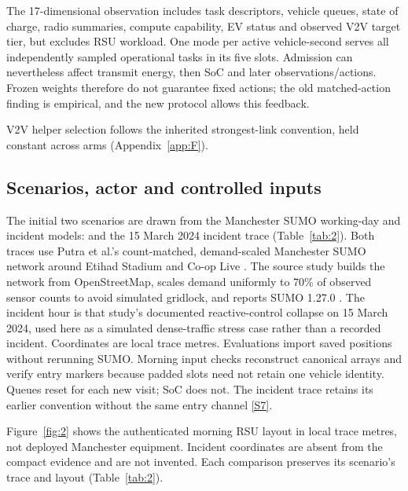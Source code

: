\documentclass[12pt,a4paper]{article}
\begin{document}
The 17-dimensional observation includes task descriptors, vehicle queues, state of charge, radio summaries, compute capability, EV status and observed V2V target tier, but excludes RSU workload. One mode per active vehicle-second serves all independently sampled operational tasks in its five slots. Admission can nevertheless affect transmit energy, then SoC and later observations/actions. Frozen weights therefore do not guarantee fixed actions; the old matched-action finding is empirical, and the new protocol allows this feedback.

V2V helper selection follows the inherited strongest-link convention, held constant across arms (Appendix~\ref{app:F}).

\FloatBarrier
\subsection{Scenarios, actor and controlled inputs}\label{sec:2.3}

The initial two scenarios are drawn from the Manchester SUMO working-day and incident models:  and the 15 March 2024 incident trace (Table~\ref{tab:2}). Both traces use Putra et al.'s count-matched, demand-scaled Manchester SUMO network around Etihad Stadium and Co-op Live \cite{ref47}. The source study builds the network from OpenStreetMap, scales demand uniformly to 70\% of observed sensor counts to avoid simulated gridlock, and reports SUMO 1.27.0 \cite{ref47}. The incident hour is that study's documented reactive-control collapse on 15 March 2024, used here as a simulated dense-traffic stress case rather than a recorded incident. Coordinates are local trace metres. Evaluations import saved positions without rerunning SUMO. Morning input checks reconstruct canonical arrays and verify entry markers because padded slots need not retain one vehicle identity. Queues reset for each new visit; SoC does not. The incident trace retains its earlier convention without the same entry channel \hyperref[source-s7]{[S7]}.

Figure~\ref{fig:2} shows the authenticated morning RSU layout in local trace metres, not deployed Manchester equipment. Incident coordinates are absent from the compact evidence and are not invented. Each comparison preserves its scenario's trace and layout (Table~\ref{tab:2}).
\end{document}
